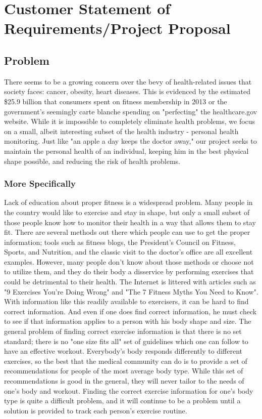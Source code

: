 \documentclass[letterpaper,english, 12pt]{scrreprt}
\begin{document}
\chapter{Customer Statement of Requirements/Project Proposal}
 
\section{Problem}
There seems to be a growing concern over the bevy of health-related issues that society faces: cancer, obesity, heart diseases. This is evidenced by the estimated \$25.9 billion that consumers spent on fitness membership in 2013 or the government's seemingly carte blanche spending on "perfecting" the healthcare.gov website. While it is impossible to completely eliminate health problems, we focus on a small, albeit interesting subset of the health industry - personal health monitoring. Just like "an apple a day keeps the doctor away," our project seeks to maintain the personal health of an individual, keeping him in the best physical shape possible, and reducing the risk of health problems. \\
 
\subsection{More Specifically}
Lack of education about proper fitness is a widespread problem. Many people in the country would like to exercise and stay in shape, but only a small subset of those people know how to monitor their health in a way that allows them to stay fit. There are several methods out there which people can use to get the proper information; tools such as fitness blogs, the President's Council on Fitness, Sports, and Nutrition, and the classic visit to the doctor's office are all excellent examples. However, many people don't know about those methods or choose not to utilize them, and they do their body a disservice by performing exercises that could be detrimental to their health. The Internet is littered with articles such as "9 Exercises You're Doing Wrong" and "The 7 Fitness Myths You Need to Know". With information like this readily available to exercisers, it can be hard to find correct information. And even if one does find correct information, he must check to see if that information applies to a person with his body shape and size. The general problem of finding correct exercise information is that there is no set standard; there is no "one size fits all" set of guidelines which one can follow to have an effective workout. Everybody's body responds differently to different exercises, so the best that the medical community can do is to provide a set of recommendations for people of the most average body type. While this set of recommendations is good in the general, they will never tailor to the needs of one's body and workout. Finding the correct exercise information for one's body type is quite a difficult problem, and it will continue to be a problem until a solution is provided to track each person's exercise routine.\\
 
\end{document}
